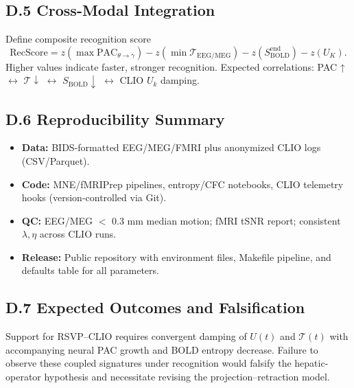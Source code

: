 \documentclass[11pt]{article}
\begin{document}
\subsection*{D.5 Cross-Modal Integration}
Define composite recognition score
\[
\mathrm{RecScore}
 = z(\max \mathrm{PAC}_{\theta\to\gamma})
   -z(\min\mathcal{T}_{\mathrm{EEG/MEG}})
   -z(S_{\mathrm{BOLD}}^{\mathrm{end}})
   -z(U_K).
\]
Higher values indicate faster, stronger recognition.
Expected correlations:
PAC ↑ $\leftrightarrow$ $\mathcal{T}\!\downarrow$
 $\leftrightarrow$ $S_{\mathrm{BOLD}}\!\downarrow$
 $\leftrightarrow$ CLIO $U_k$ damping.

\subsection*{D.6 Reproducibility Summary}
\begin{itemize}
\item \textbf{Data:} BIDS-formatted EEG/MEG/FMRI plus anonymized CLIO logs (CSV/Parquet).  
\item \textbf{Code:} MNE/fMRIPrep pipelines, entropy/CFC notebooks, CLIO telemetry hooks
(version-controlled via Git).  
\item \textbf{QC:} EEG/MEG $<$ 0.3 mm median motion; fMRI tSNR report; 
consistent $\lambda,\eta$ across CLIO runs.  
\item \textbf{Release:} Public repository with environment files, Makefile pipeline, 
and defaults table for all parameters.
\end{itemize}

\subsection*{D.7 Expected Outcomes and Falsification}
Support for RSVP–CLIO requires convergent damping of 
$U(t)$ and $\mathcal{T}(t)$ with accompanying neural PAC growth and BOLD entropy
decrease.
Failure to observe these coupled signatures under recognition 
would falsify the hepatic-operator hypothesis and necessitate revising
the projection–retraction model.


\newpage


\end{document}
